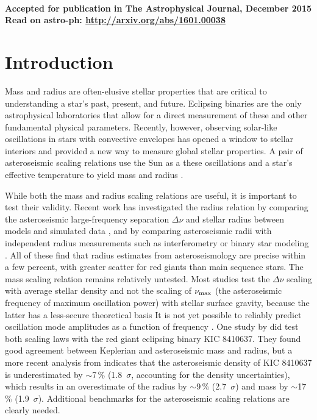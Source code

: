 \textbf{\\ Accepted for publication in The Astrophysical Journal, December 2015 \\ Read on astro-ph: \url{http://arxiv.org/abs/1601.00038}} \\


\section{Introduction}\label{intro}


Mass and radius are often-elusive stellar properties that are critical to understanding a star's past, present, and future. Eclipsing binaries are the only astrophysical laboratories that allow for a direct measurement of these and other fundamental physical parameters. Recently, however, observing solar-like oscillations in stars with convective envelopes has opened a window to stellar interiors and provided a new way to measure global stellar properties. A pair of asteroseismic scaling relations use the Sun as a  these oscillations and a star's effective temperature to yield mass and radius \citep{kje95,hub10,mos13}.

While both the mass and radius scaling relations are useful, it is important to test their validity. Recent work has investigated the radius relation by comparing the asteroseismic large-frequency separation $\Delta \nu$ and stellar radius between models and simulated data \citep[e.g.][]{ste09,whi11,mig13}, and by comparing asteroseismic radii with independent radius measurements such as interferometry or binary star modeling \citep[e.g.][]{hub11,hub12,sil12}. All of these find that radius estimates from asteroseismology are precise within a few percent, with greater scatter for red giants than main sequence stars. The mass scaling relation remains relatively untested. Most studies test the $\Delta\nu$ scaling with average stellar density and not the scaling of $\nu_{\rm{max}}$ (the asteroseismic frequency of maximum oscillation power) with stellar surface gravity, because the latter has a less-secure theoretical basis  It is not yet possible to reliably predict oscillation mode amplitudes as a function of frequency \citep{chr12}. One study by \citet{fra13} did test both scaling laws with the red giant eclipsing binary KIC 8410637. They found good agreement between Keplerian and asteroseismic mass and radius, but a more recent analysis from \citet{hub14} indicates that the asteroseismic density of KIC 8410637 is underestimated by $\sim$7\,\% (1.8~$\sigma$, accounting for the density uncertainties), which results in an overestimate of the radius by $\sim$9\,\% (2.7~$\sigma$) and mass by $\sim$17\,\% (1.9~$\sigma$). Additional benchmarks for the asteroseismic scaling relations are clearly needed.

